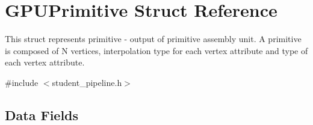 \hypertarget{structGPUPrimitive}{}\section{G\+P\+U\+Primitive Struct Reference}
\label{structGPUPrimitive}


This struct represents primitive -\/ output of primitive assembly unit. A primitive is composed of N vertices, interpolation type for each vertex attribute and type of each vertex attribute.  




{\ttfamily \#include $<$student\+\_\+pipeline.\+h$>$}

\subsection*{Data Fields}
